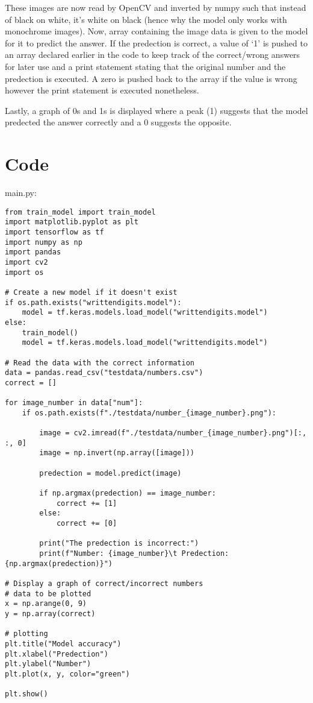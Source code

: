 \documentclass{article}
\begin{document}
These images are now read by OpenCV and inverted by numpy such that instead of
black on white, it's white on black (hence why the model only works with
monochrome images). Now, array containing the image data is given to the model
for it to predict the answer. If the predection is correct, a value of `1' is
pushed to an array declared earlier in the code to keep track of the correct/wrong
answers for later use and a print statement stating that the original number and
the predection is executed. A zero is pushed back to the array if the value is wrong
however the print statement is executed nonetheless.

Lastly, a graph of 0s and 1s is displayed where a peak (1) suggests that the model
predected the answer correctly and a 0 suggests the opposite.

\section{Code}
main.py:
\begin{verbatim}
from train_model import train_model
import matplotlib.pyplot as plt
import tensorflow as tf
import numpy as np
import pandas
import cv2
import os

# Create a new model if it doesn't exist
if os.path.exists("writtendigits.model"):
    model = tf.keras.models.load_model("writtendigits.model")
else:
    train_model()
    model = tf.keras.models.load_model("writtendigits.model")

# Read the data with the correct information
data = pandas.read_csv("testdata/numbers.csv")
correct = []

for image_number in data["num"]:
    if os.path.exists(f"./testdata/number_{image_number}.png"):

        image = cv2.imread(f"./testdata/number_{image_number}.png")[:, :, 0]
        image = np.invert(np.array([image]))

        predection = model.predict(image)

        if np.argmax(predection) == image_number:
            correct += [1]
        else:
            correct += [0]

        print("The predection is incorrect:")
        print(f"Number: {image_number}\t Predection: {np.argmax(predection)}")

# Display a graph of correct/incorrect numbers
# data to be plotted
x = np.arange(0, 9)
y = np.array(correct)

# plotting
plt.title("Model accuracy")
plt.xlabel("Predection")
plt.ylabel("Number")
plt.plot(x, y, color="green")

plt.show()
\end{verbatim}
\end{document}
